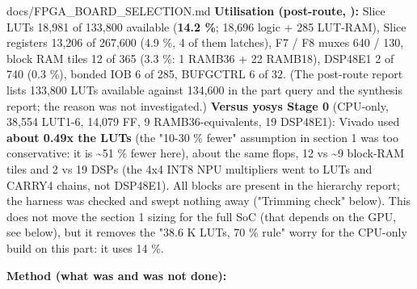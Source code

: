 \begin{relocated}{docs/FPGA_BOARD_SELECTION.md}
\textbf{Utilisation (post-route, ):} Slice LUTs
18,981 of 133,800 available (\textbf{14.2 \%}; 18,696 logic + 285
LUT-RAM), Slice registers 13,206 of 267,600 (4.9 \%, 4 of them latches),
F7 / F8 muxes 640 / 130, block RAM tiles 12 of 365 (3.3 \%: 1 RAMB36 +
22 RAMB18), DSP48E1 2 of 740 (0.3 \%), bonded IOB 6 of 285, BUFGCTRL 6
of 32. (The post-route report lists 133,800 LUTs available against
134,600 in the part query and the synthesis report; the reason was not
investigated.) \textbf{Versus yosys Stage 0} (CPU-only, 38,554 LUT1-6,
14,079 FF, 9 RAMB36-equivalents, 19 DSP48E1): Vivado used \textbf{about
0.49x the LUTs} (the "10-30 \% fewer" assumption in section 1 was too
conservative: it is \textasciitilde51 \% fewer here), about the same
flops, 12 vs \textasciitilde9 block-RAM tiles and 2 vs 19 DSPs (the 4x4
INT8 NPU multipliers went to LUTs and CARRY4 chains, not DSP48E1). All
blocks are present in the hierarchy report; the harness was checked and
swept nothing away ("Trimming check" below). This does not move the
section 1 sizing for the full SoC (that depends on the GPU, see below),
but it removes the "38.6 K LUTs, 70 \% rule" worry for the CPU-only
build on this part: it uses 14 \%.

\textbf{Method (what was and was not done):}


\end{relocated}
